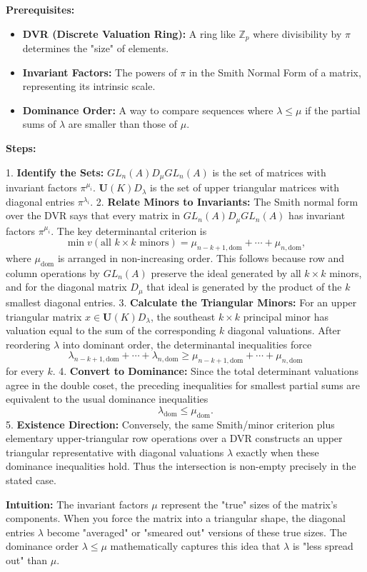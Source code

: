 \begin{solution}
\textbf{Prerequisites:}
\begin{itemize}
    \item \textbf{DVR (Discrete Valuation Ring):} A ring like $\mathbb{Z}_p$ where divisibility by $\pi$ determines the "size" of elements.
    \item \textbf{Invariant Factors:} The powers of $\pi$ in the Smith Normal Form of a matrix, representing its intrinsic scale.
    \item \textbf{Dominance Order:} A way to compare sequences where $\lambda \leq \mu$ if the partial sums of $\lambda$ are smaller than those of $\mu$.
\end{itemize}

\textbf{Steps:}

1. \textbf{Identify the Sets:} $GL_n(A) D_\mu GL_n(A)$ is the set of matrices with invariant factors $\pi^{\mu_i}$. $\mathbf{U}(K) D_\lambda$ is the set of upper triangular matrices with diagonal entries $\pi^{\lambda_i}$.
2. \textbf{Relate Minors to Invariants:} The Smith normal form over the DVR says that every matrix in $GL_n(A)D_\mu GL_n(A)$ has invariant factors $\pi^{\mu_i}$. The key determinantal criterion is
\[
\min v(\text{all } k\times k \text{ minors})
=\mu_{n-k+1,\mathrm{dom}}+\cdots+\mu_{n,\mathrm{dom}},
\]
where $\mu_{\mathrm{dom}}$ is arranged in non-increasing order. This follows because row and column operations by $GL_n(A)$ preserve the ideal generated by all $k\times k$ minors, and for the diagonal matrix $D_\mu$ that ideal is generated by the product of the $k$ smallest diagonal entries.
3. \textbf{Calculate the Triangular Minors:} For an upper triangular matrix $x\in \mathbf{U}(K)D_\lambda$, the southeast $k\times k$ principal minor has valuation equal to the sum of the corresponding $k$ diagonal valuations. After reordering $\lambda$ into dominant order, the determinantal inequalities force
\[
\lambda_{n-k+1,\mathrm{dom}}+\cdots+\lambda_{n,\mathrm{dom}}
\geq
\mu_{n-k+1,\mathrm{dom}}+\cdots+\mu_{n,\mathrm{dom}}
\]
for every $k$.
4. \textbf{Convert to Dominance:} Since the total determinant valuations agree in the double coset, the preceding inequalities for smallest partial sums are equivalent to the usual dominance inequalities
\[
\lambda_{\mathrm{dom}}\leq \mu_{\mathrm{dom}}.
\]
5. \textbf{Existence Direction:} Conversely, the same Smith/minor criterion plus elementary upper-triangular row operations over a DVR constructs an upper triangular representative with diagonal valuations $\lambda$ exactly when these dominance inequalities hold. Thus the intersection is non-empty precisely in the stated case.

\textbf{Intuition:}
The invariant factors $\mu$ represent the "true" sizes of the matrix's components. When you force the matrix into a triangular shape, the diagonal entries $\lambda$ become "averaged" or "smeared out" versions of these true sizes. The dominance order $\lambda \leq \mu$ mathematically captures this idea that $\lambda$ is "less spread out" than $\mu$.
\end{solution}

